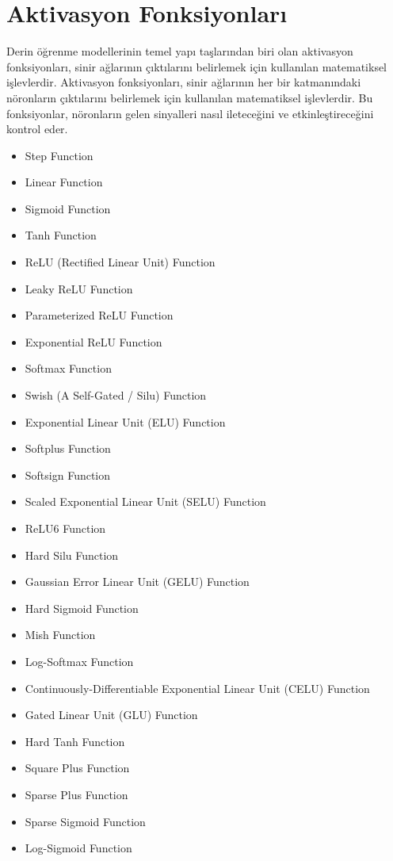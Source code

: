\section{Aktivasyon Fonksiyonları}
Derin öğrenme modellerinin temel yapı taşlarından biri olan aktivasyon fonksiyonları, sinir ağlarının çıktılarını belirlemek için kullanılan matematiksel işlevlerdir. Aktivasyon fonksiyonları, sinir ağlarının her bir katmanındaki nöronların çıktılarını belirlemek için kullanılan matematiksel işlevlerdir. Bu fonksiyonlar, nöronların gelen sinyalleri nasıl ileteceğini ve etkinleştireceğini kontrol eder.

\begin{itemize}
    \item Step Function
    \item Linear Function
    \item Sigmoid Function
    \item Tanh Function
    \item ReLU (Rectified Linear Unit) Function
    \item Leaky ReLU Function
    \item Parameterized ReLU Function
    \item Exponential ReLU Function
    \item Softmax Function
    \item Swish (A Self-Gated / Silu) Function
    \item Exponential Linear Unit (ELU) Function
    \item Softplus Function
    \item Softsign Function
    \item Scaled Exponential Linear Unit (SELU) Function
    \item ReLU6 Function
    \item Hard Silu Function
    \item Gaussian Error Linear Unit (GELU) Function
    \item Hard Sigmoid Function
    \item Mish Function
    \item Log-Softmax Function
    \item Continuously-Differentiable Exponential Linear Unit (CELU) Function
    \item Gated Linear Unit (GLU) Function
    \item Hard Tanh Function
    \item Square Plus Function
    \item Sparse Plus Function
    \item Sparse Sigmoid Function
    \item Log-Sigmoid Function
\end{itemize}

